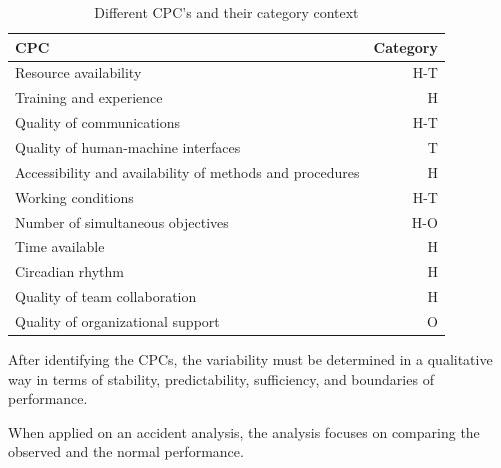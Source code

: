 \begin{table}[h]
\centering
    \begin{tabular}{ | l | r | }
    \hline
    CPC                                                      & Category \\ \hline \hline
    Resource availability                                    &     H-T  \\ \hline
    Training and experience                                  &       H  \\ \hline
    Quality of communications                                &     H-T  \\ \hline
    Quality of human-machine interfaces                      &       T  \\ \hline
    Accessibility and availability of methods and procedures &       H  \\ \hline
    Working conditions                                       &     H-T  \\ \hline
    Number of simultaneous objectives                        &     H-O  \\ \hline
    Time available                                           &       H  \\ \hline
    Circadian rhythm                                         &       H  \\ \hline
    Quality of team collaboration                            &       H  \\ \hline
    Quality of organizational support                        &       O  \\ \hline
    \end{tabular}
\caption{Different CPC's and their category context}
\label{table:cpcs}
\end{table}

After identifying the CPCs, the variability must be determined in a qualitative way in terms of stability, predictability, sufficiency, and boundaries of performance. 




When applied on an accident analysis, the analysis focuses on comparing the observed and the normal performance.


